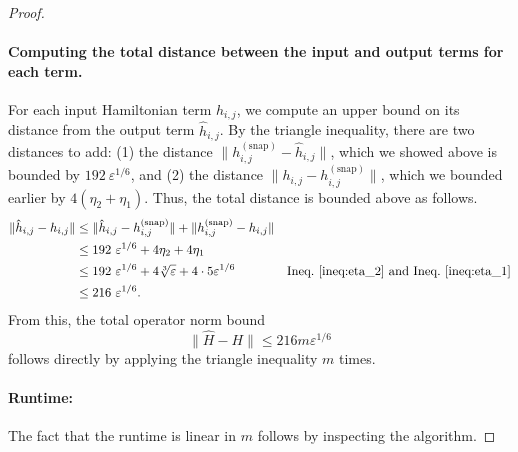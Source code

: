 \documentclass[11pt]{article}
\theoremstyle{plain}
\newcommand{\eps}{\varepsilon}
\newcommand{\snp}{{(\mathrm{snap})}}
\begin{document}
\begin{proof}
\paragraph{Computing the total distance between the input and output terms for each term.}
For each input Hamiltonian term $h_{i,j}$, we compute an upper bound on its distance from the output term $\hat{h}_{i,j}$. By the triangle inequality, there are two distances to add: (1) the distance $\|h^\snp_{i,j} - \hat{h}_{i,j}\|$, which we showed above is bounded by $192\ \eps^{1/6}$, and (2) the distance $\|h_{i,j} - h^\snp_{i,j} \|$, which we bounded earlier by $4 (\eta_2 + \eta_1)$. Thus, the total distance is bounded above as follows.
\begin{align*}
    \|\hat{h}_{i,j} - h_{i,j}\| &\leq \|\hat{h}_{i,j} - h^\snp_{i,j}\| + \|h^\snp_{i,j} - h_{i,j}\|\\
    & \leq 192\ \eps^{1/6} + 4 \eta_2 + 4 \eta_1\\
    & \leq 192\ \eps^{1/6} + 4 \sqrt[3]{\eps} + 4 \cdot 5 \eps^{1/6} & \text{Ineq.~\ref{ineq:eta_2} and Ineq.~\ref{ineq:eta_1}}\\
    & \leq 216\ \eps^{1/6}.
\end{align*}
From this, the total operator norm bound
\[ \|\hat{H} - H \| \leq 216 m \eps^{1/6} \]
follows directly by applying the triangle inequality $m$ times.

\paragraph{Runtime:} The fact that the runtime is linear in $m$ follows by inspecting the algorithm.
\end{proof}
\end{document}
